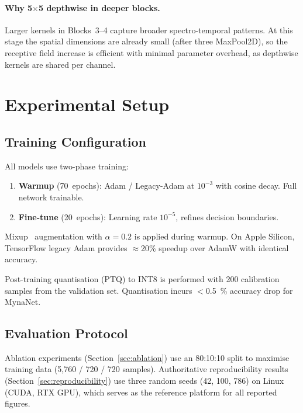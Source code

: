 \documentclass[final,5p,times,twocolumn,nolinenum]{elsarticle}
\begin{document}
\paragraph{Why 5$\times$5 depthwise in deeper blocks.}
Larger kernels in Blocks~3--4 capture broader spectro-temporal patterns.
At this stage the spatial dimensions are already small (after three
MaxPool2D), so the receptive field increase is efficient with minimal
parameter overhead, as depthwise kernels are shared per channel.

\section{Experimental Setup}
\label{sec:setup}

\subsection{Training Configuration}

All models use two-phase training:
\begin{enumerate}
  \item \textbf{Warmup} (70~epochs): Adam / Legacy-Adam at $10^{-3}$ with
        cosine decay. Full network trainable.
  \item \textbf{Fine-tune} (20~epochs): Learning rate $10^{-5}$, refines
        decision boundaries.
\end{enumerate}

Mixup~\cite{zhang2018mixup} augmentation with $\alpha=0.2$ is applied
during warmup. On Apple Silicon, TensorFlow legacy Adam provides
$\approx$20\% speedup over AdamW with identical accuracy.

Post-training quantisation (PTQ) to INT8 is performed with 200 calibration
samples from the validation set. Quantisation incurs $<$\SI{0.5}{\percent}
accuracy drop for MynaNet.

\subsection{Evaluation Protocol}

Ablation experiments (Section~\ref{sec:ablation}) use an 80:10:10 split
to maximise training data (5{,}760 / 720 / 720 samples). Authoritative
reproducibility results (Section~\ref{sec:reproducibility}) use three
random seeds (42, 100, 786) on Linux (CUDA, RTX GPU), which serves as
the reference platform for all reported figures.
\end{document}
